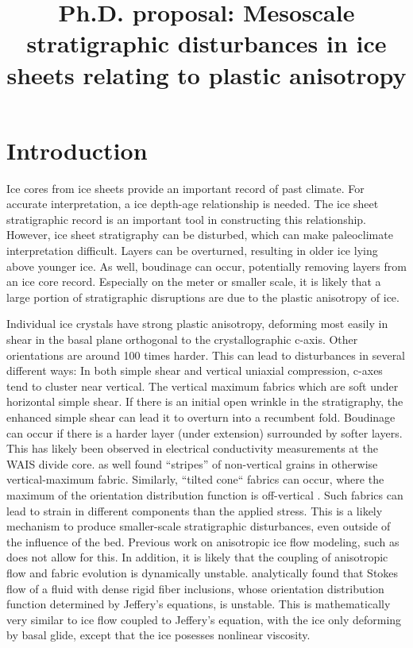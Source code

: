 \documentclass{article}
\begin{document}
\title{Ph.D. proposal: Mesoscale stratigraphic disturbances in ice sheets relating to plastic anisotropy}

\section{Introduction}
Ice cores from ice sheets provide an important record of past climate.  For accurate interpretation, a ice depth-age relationship is needed. The ice sheet stratigraphic record is an important tool in constructing this relationship. However, ice sheet stratigraphy can be disturbed, which can make paleoclimate interpretation difficult. Layers can be overturned, resulting in older ice lying above younger ice. As well, boudinage can occur, potentially removing layers from an ice core record. Especially on the meter or smaller scale, it is likely that a large portion of stratigraphic disruptions are due to the plastic anisotropy of ice.

 Individual ice crystals have strong plastic anisotropy, deforming most easily in shear in the basal plane orthogonal to the crystallographic c-axis. Other orientations are around 100 times harder. This can lead to disturbances in several different ways: In both simple shear and vertical uniaxial compression, c-axes tend to cluster near vertical. The vertical maximum fabrics which are soft under horizontal simple shear. If there is an initial open wrinkle in the stratigraphy, the enhanced simple shear can lead it to overturn into a recumbent fold. Boudinage can occur if there is a harder layer (under extension) surrounded by softer layers. This has likely been observed in electrical conductivity measurements at the WAIS divide core. \citet{alley97} as well found ``stripes'' of non-vertical grains in otherwise vertical-maximum fabric. Similarly, ``tilted cone`` fabrics can occur, where the maximum of the orientation distribution function is off-vertical \citep{throstur2002}. Such fabrics can lead to strain in different components than the applied stress. This is a likely mechanism to produce smaller-scale stratigraphic disturbances, even outside of the influence of the bed. Previous work on anisotropic ice flow modeling, such as \citet{gillet2005} does not allow for this. In addition, it is likely that the coupling of anisotropic flow and fabric evolution is dynamically unstable. \citet{montgomery-smith2011} analytically found that Stokes flow of a fluid with dense rigid fiber inclusions, whose orientation distribution function determined by Jeffery's equations, is unstable. This is mathematically very similar to ice flow coupled to Jeffery's equation, with the ice only deforming by basal glide, except that the ice posesses nonlinear viscosity.
\end{document}
